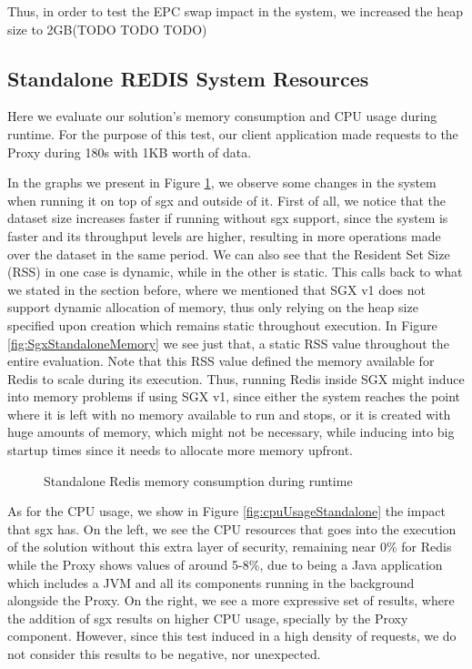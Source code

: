 Thus, in order to test the EPC swap impact in the system, we increased the heap size to 2GB(TODO TODO TODO)


\subsection{Standalone REDIS System Resources}

Here we evaluate our solution's memory consumption and CPU usage during runtime. 
For the purpose of this test, our client application made requests to the Proxy during 180s with 1KB worth of data.  

In the graphs we present in Figure \ref{fig:MemoryConsumption_standalone}, we observe some changes in the system when running it on top of \gls{sgx} and outside of it. First of all, we notice that the dataset size increases faster if running without \gls{sgx} support, since the system is faster and its throughput levels are higher, resulting in more operations made over the dataset in the same period. We can also see that the Resident Set Size (RSS) in one case is dynamic, while in the other is static. This calls back to what we stated in the section before, where we mentioned that SGX v1 does not support dynamic allocation of memory, thus only relying on the heap size specified upon creation which remains static throughout execution. In Figure \ref{fig:SgxStandaloneMemory} we see just that, a static RSS value throughout the entire evaluation. Note that this RSS value defined the memory available for Redis to scale during its execution. Thus, running Redis inside SGX might induce into memory problems if using SGX v1, since either the system reaches the point where it is left with no memory available to run and stops, or it is created with huge amounts of memory, which might not be necessary, while inducing into big startup times since it needs to allocate more memory upfront.

\begin{figure}[htbp]
	\centering
	\caption{Standalone Redis memory consumption during runtime}
	\label{fig:MemoryConsumption_standalone}
\end{figure}

As for the CPU usage, we show in Figure \ref{fig:cpuUsageStandalone} the impact that \gls{sgx} has. On the left, we see the CPU resources that goes into the execution of the solution without this extra layer of security, remaining near 0\% for Redis while the Proxy shows values of around 5-8\%, due to being a Java application which includes a JVM and all its components running in the background alongside the Proxy. On the right, we see a more expressive set of results, where the addition of \gls{sgx} results on higher CPU usage, specially by the Proxy component. However, since this test induced in a high density of requests, we do not consider this results to be negative, nor unexpected.

